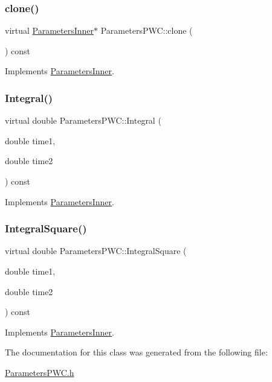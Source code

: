 \subsubsection{\texorpdfstring{clone()}{clone()}}
{\footnotesize\ttfamily virtual \hyperlink{classParametersInner}{Parameters\+Inner}$\ast$ Parameters\+P\+W\+C\+::clone (\begin{DoxyParamCaption}{ }\end{DoxyParamCaption}) const\hspace{0.3cm}{\ttfamily [virtual]}}



Implements \hyperlink{classParametersInner_a421a238e889bfe41cc7db9d7e918d4b0}{Parameters\+Inner}.

\hypertarget{classParametersPWC_a42002b8d813dfaefe3a41f4a520ac6a6}{}\label{classParametersPWC_a42002b8d813dfaefe3a41f4a520ac6a6} 
\subsubsection{\texorpdfstring{Integral()}{Integral()}}
{\footnotesize\ttfamily virtual double Parameters\+P\+W\+C\+::\+Integral (\begin{DoxyParamCaption}\item[{double}]{time1,  }\item[{double}]{time2 }\end{DoxyParamCaption}) const\hspace{0.3cm}{\ttfamily [virtual]}}



Implements \hyperlink{classParametersInner_ade3035097353fd2f38d3a20bf737d46a}{Parameters\+Inner}.

\hypertarget{classParametersPWC_a3ab6b8a736641290561b5e8a748a6199}{}\label{classParametersPWC_a3ab6b8a736641290561b5e8a748a6199} 
\subsubsection{\texorpdfstring{Integral\+Square()}{IntegralSquare()}}
{\footnotesize\ttfamily virtual double Parameters\+P\+W\+C\+::\+Integral\+Square (\begin{DoxyParamCaption}\item[{double}]{time1,  }\item[{double}]{time2 }\end{DoxyParamCaption}) const\hspace{0.3cm}{\ttfamily [virtual]}}



Implements \hyperlink{classParametersInner_a12e3be9c5daf0d6dc74a460905f1b46e}{Parameters\+Inner}.



The documentation for this class was generated from the following file\+:\begin{DoxyCompactItemize}
\item 
\hyperlink{ParametersPWC_8h}{Parameters\+P\+W\+C.\+h}\end{DoxyCompactItemize}
